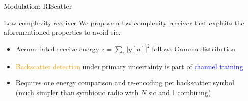 \documentclass[presentation,xcolor={table},9pt]{beamer}
\begin{document}
\begin{section}{Modulation: RIScatter}
	\begin{frame}{Low-complexity receiver}
		We propose a low-complexity receiver that exploits the aforementioned properties to avoid \gls{sic}.
		\begin{figure}[!t]
			\centering
			\subfloat{
				\resizebox{0.42\linewidth}{!}{
					
				}
			}
			\subfloat{
				\resizebox{0.58\linewidth}{!}{
					
				}
			}
			\label{fg:receiver}
		\end{figure}
		\vspace{0.5cm}
		\begin{itemize}
			\item Accumulated receive energy $z=\sum_{n} \bigl\lvert y[n] \bigr\rvert^2$ follows Gamma distribution
			\item \textcolor{orange}{Backscatter detection} under primary uncertainty is part of \textcolor{blue}{channel training}
			\item Requires one energy comparison and re-encoding per backscatter symbol (much simpler than symbiotic radio with $N$ \gls{sic} and 1 combining)
		\end{itemize}
	\end{frame}



\end{section}
\end{document}
